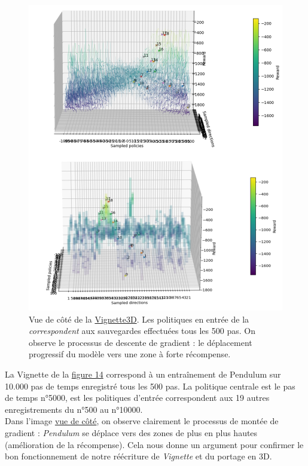 \documentclass[12pt]{article}
\begin{document}
\begin{figure}[htp]
    \centering
    \includegraphics[width=15cm]{Images/vignette_cote}
    \caption{Vue de côté de la \hyperref[fig:vignette3D]{Vignette3D}. Les politiques en entrée de la \emph{correspondent} aux sauvegardes effectuées tous les 500 pas. On observe le processus de descente de gradient : le déplacement progressif du modèle vers une zone à forte récompense.}
    \label{fig:vignetteCote}
\end{figure}

La Vignette de la \hyperref[fig:vignetteCote]{figure 14} correspond à un entraînement de Pendulum sur 10.000 pas de temps enregistré tous les 500 pas. La politique centrale est le pas de temps n°5000, est les politiques d'entrée correspondent aux 19 autres enregistrements du n°500 au n°10000. \\

Dans l'image \hyperref[fig:vignetteCote]{vue de côté}, on observe clairement le processus de montée de gradient : \emph{Pendulum} se déplace vers des zones de plus en plus hautes (amélioration de la récompense). Cela nous donne un argument pour confirmer le bon fonctionnement de notre réécriture de \emph{Vignette} et du portage en 3D.\\
\end{document}
